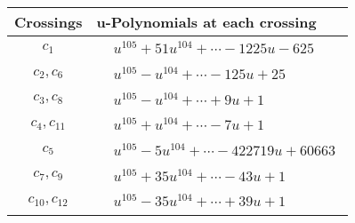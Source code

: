 \documentclass[1p]{elsarticle_modified}
\theoremstyle{definition}
\begin{document}
\begin{tabular}{m{50pt}|m{274pt}}
Crossings & \hspace{64pt}u-Polynomials at each crossing \\
\hline $$\begin{aligned}c_{1}\end{aligned}$$&$\begin{aligned}
&u^{105}+51 u^{104}+\cdots-1225 u-625
\end{aligned}$\\
\hline $$\begin{aligned}c_{2},c_{6}\end{aligned}$$&$\begin{aligned}
&u^{105}- u^{104}+\cdots-125 u+25
\end{aligned}$\\
\hline $$\begin{aligned}c_{3},c_{8}\end{aligned}$$&$\begin{aligned}
&u^{105}- u^{104}+\cdots+9 u+1
\end{aligned}$\\
\hline $$\begin{aligned}c_{4},c_{11}\end{aligned}$$&$\begin{aligned}
&u^{105}+u^{104}+\cdots-7 u+1
\end{aligned}$\\
\hline $$\begin{aligned}c_{5}\end{aligned}$$&$\begin{aligned}
&u^{105}-5 u^{104}+\cdots-422719 u+60663
\end{aligned}$\\
\hline $$\begin{aligned}c_{7},c_{9}\end{aligned}$$&$\begin{aligned}
&u^{105}+35 u^{104}+\cdots-43 u+1
\end{aligned}$\\
\hline $$\begin{aligned}c_{10},c_{12}\end{aligned}$$&$\begin{aligned}
&u^{105}-35 u^{104}+\cdots+39 u+1
\end{aligned}$\\
\hline
\end{tabular}\\~\\
\newpage\renewcommand{\arraystretch}{1}
\end{document}
